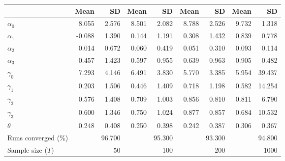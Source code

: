 
\begin{tabular}[t]{lrrrrrrrr}
\toprule
  & Mean & SD & Mean  & SD  & Mean   & SD   & Mean    & SD   \\
\midrule
$\alpha_{0}$ & 8.055 & 2.576 & 8.501 & 2.082 & 8.788 & 2.526 & 9.732 & 1.318\\
$\alpha_{1}$ & -0.088 & 1.390 & 0.144 & 1.191 & 0.308 & 1.432 & 0.839 & 0.778\\
$\alpha_{2}$ & 0.014 & 0.672 & 0.060 & 0.419 & 0.051 & 0.310 & 0.093 & 0.114\\
$\alpha_{3}$ & 0.457 & 1.423 & 0.597 & 0.955 & 0.639 & 0.963 & 0.905 & 0.482\\
$\gamma_{0}$ & 7.293 & 4.146 & 6.491 & 3.830 & 5.770 & 3.385 & 5.954 & 39.437\\
$\gamma_{1}$ & 0.203 & 1.506 & 0.446 & 1.409 & 0.718 & 1.198 & 0.582 & 14.254\\
$\gamma_{2}$ & 0.576 & 1.408 & 0.709 & 1.003 & 0.856 & 0.810 & 0.811 & 6.790\\
$\gamma_{3}$ & 0.600 & 1.346 & 0.750 & 1.024 & 0.877 & 0.857 & 0.684 & 10.532\\
$\theta$ & 0.248 & 0.408 & 0.250 & 0.398 & 0.242 & 0.387 & 0.306 & 0.367\\
Runs converged (\%) &  & 96.700 &  & 95.300 &  & 93.300 &  & 94.800\\
Sample size ($T$) &  & 50 &  & 100 &  & 200 &  & 1000\\
\bottomrule
\end{tabular}
